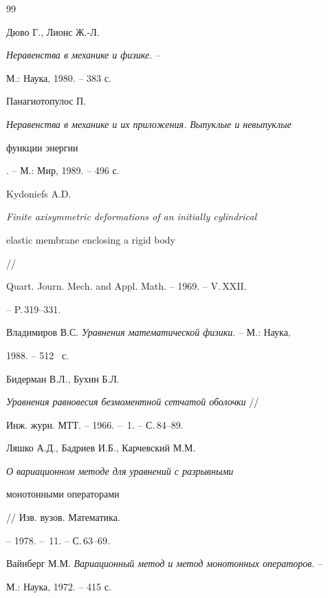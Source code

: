 \begin{thebibliography}{99}


Дюво Г., Лионс Ж.-Л.


{\em Неравенства в механике и физике}. --


М.: Наука, 1980. -- 383 с.







Панагиотопулос П.


{\em Неравенства в механике и их приложения. Выпуклые и невыпуклые 


функции энергии}. -- М.: Мир, 1989. -- 496 с.







Kydoniefs A.D.


{\em Finite axisymmetric deformations of an initially cylindrical 


elastic membrane enclosing a rigid body} //


Quart. Journ. Mech. and Appl. Math. -- 1969. -- V.\,XXII.


-- P.\,319--331.







Владимиров В.С. {\em Уравнения математической физики}. -- М.: Наука, 


1988. -- 512~ с. 







Бидерман В.Л., Бухин Б.Л.


{\em Уравнения равновесия безмоментной сетчатой оболочки} //


Инж. журн. МТТ. -- 1966. -- \No\,1. -- С.\,84--89. 







Ляшко А.Д., Бадриев И.Б., Карчевский М.М.


{\em О вариационном методе для уравнений с разрывными 


монотонными операторами} // Изв. вузов. Математика.


-- 1978. -- \No\,11. -- С.\,63--69. 







Вайнберг М.М. {\em Вариационный метод и метод монотонных операторов}. --


М.: Наука, 1972. -- 415 с.





\end{thebibliography}





\vskip 2cm












\label{end}





